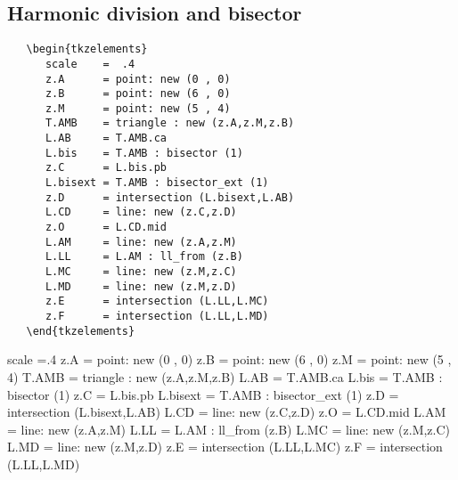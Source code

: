 \subsection{Harmonic division and bisector} %
\label{sub:harmonic_division_and_bisector}

\begin{minipage}{.4\textwidth}
   \begin{verbatim}
   \begin{tkzelements}  
      scale    =  .4
      z.A      = point: new (0 , 0)
      z.B      = point: new (6 , 0)
      z.M      = point: new (5 , 4)
      T.AMB    = triangle : new (z.A,z.M,z.B)
      L.AB     = T.AMB.ca
      L.bis    = T.AMB : bisector (1)
      z.C      = L.bis.pb
      L.bisext = T.AMB : bisector_ext (1)
      z.D      = intersection (L.bisext,L.AB)
      L.CD     = line: new (z.C,z.D)
      z.O      = L.CD.mid
      L.AM     = line: new (z.A,z.M)
      L.LL     = L.AM : ll_from (z.B)
      L.MC     = line: new (z.M,z.C)
      L.MD     = line: new (z.M,z.D)
      z.E      = intersection (L.LL,L.MC)
      z.F      = intersection (L.LL,L.MD)
   \end{tkzelements}
   \end{verbatim}
\end{minipage}
\begin{minipage}{.6\textwidth}
\begin{tkzelements}  
   scale =.4
   z.A  = point: new (0 , 0)
   z.B  = point: new (6 , 0)
   z.M  = point: new (5 , 4)
   T.AMB    = triangle : new (z.A,z.M,z.B)
   L.AB = T.AMB.ca
   L.bis    = T.AMB : bisector (1)
   z.C  = L.bis.pb
   L.bisext = T.AMB : bisector_ext (1)
   z.D  = intersection (L.bisext,L.AB)
   L.CD = line: new (z.C,z.D)
   z.O  = L.CD.mid
   L.AM = line: new (z.A,z.M)
   L.LL = L.AM : ll_from (z.B)
   L.MC = line: new (z.M,z.C)
   L.MD = line: new (z.M,z.D)
   z.E  = intersection (L.LL,L.MC)
   z.F  = intersection (L.LL,L.MD)
\end{tkzelements}
\hspace{\fill}   
\end{minipage}

